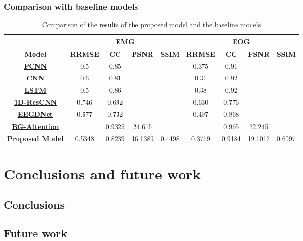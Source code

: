 \documentclass[a4paper]{sapthesis}
\begin{document}
\subsection{Comparison with baseline models}
\begin{table}[h!]
\centering
\caption{Comparison of the results of the proposed model and the baseline models}
\label{tab:results}
\begin{adjustbox}{max width=\textwidth}
\begin{tabular}{|c|c|c|c|c|c|c|c|c|}
\hline
\multicolumn{1}{|c|}{} & \multicolumn{4}{c|}{\textbf{EMG}} & \multicolumn{4}{c|}{\textbf{EOG}} \\ \cline{2-7}
\hline
\textbf{Model} & \textbf{RRMSE} & \textbf{CC} & \textbf{PSNR} & \textbf{SSIM} & \textbf{RRMSE} & \textbf{CC} & \textbf{PSNR} & \textbf{SSIM} \\ 
\hline
\textbf{\hyperref[sec:model_fcnn]{FCNN}} & 0.5 & 0.85&  &  & 0.375 & 0.91 & &  \\
\hline
\textbf{\hyperref[sec:model_cnn]{CNN}} & 0.6 & 0.81 & & & 0.31 & 0.92 & & \\
\hline
\textbf{\hyperref[sec:model_lstm]{LSTM}} & 0.5 & 0.86 & & & 0.38 &0.92 &  & \\
\hline
\textbf{\hyperref[sec:1D-ResCNN]{1D-ResCNN}} & 0.746 & 0.692 & & & 0.630 & 0.776 & & \\
\hline
\textbf{\hyperref[sec:EEGDNet]{EEGDNet}} &0.677 & 0.732 & &  & 0.497 & 0.868 &  & \\
\hline
\textbf{\hyperref[sec:model_transformer_gru]{BG-Attention}} & & 0.9325 & 24.615 &  &  & 0.965 & 32.245 &  \\
\hline
\textbf{\hyperref[sec:model_proposed]{Proposed Model}} & 0.5348&	0.8239&	16.1380&	0.4498

& 0.3719	&0.9184	&19.1013	&0.6097


\\
\hline
\end{tabular}
\end{adjustbox}
\end{table}

\chapter{Conclusions and future work}
\section{Conclusions}
\section{Future work}
\end{document}
